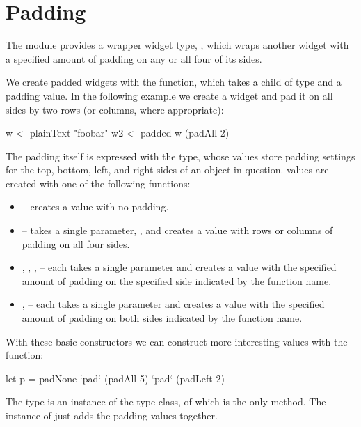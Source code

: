 \section{Padding}
\label{sec:padding}

The  module provides a wrapper widget type, ,
which wraps another widget with a specified amount of padding on any
or all four of its sides.

We create padded widgets with the  function, which takes a
child of type  and a padding value.  In the following
example we create a  widget and pad it on all sides
by two rows (or columns, where appropriate):

\begin{haskellcode}
 w <- plainText "foobar"
 w2 <- padded w (padAll 2)
\end{haskellcode}

The padding itself is expressed with the  type, whose
values store padding settings for the top, bottom, left, and right
sides of an object in question.   values are created with
one of the following functions:

\begin{itemize}
\item {} -- creates a  value with no padding.
\item {} -- takes a single parameter, , and creates a
   value with  rows or columns of padding on all
  four sides.
\item {}, , ,  -- each
  takes a single parameter and creates a  value with the
  specified amount of padding on the specified side indicated by the
  function name.
\item {},  -- each takes a single
  parameter and creates a  value with the specified
  amount of padding on both sides indicated by the function name.
\end{itemize}

With these basic  constructors we can construct more
interesting  values with the  function:

\begin{haskellcode}
 let p = padNone `pad` (padAll 5) `pad` (padLeft 2)
\end{haskellcode}

The  type is an instance of the  type class,
of which  is the only method.  The  instance of
 just adds the padding values together.

